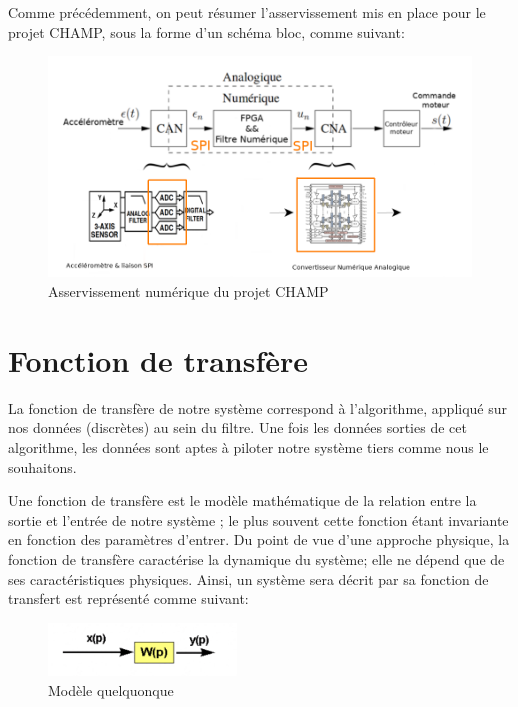 \documentclass[french,a4paper,12pt]{report}
\begin{document}
		Comme précédemment, on peut résumer l'asservissement mis en place pour le projet CHAMP, sous la forme d'un schéma bloc, comme suivant:
		
	\begin{figure}[!ht]
    \center
  	\includegraphics[width=17cm]{Assert_2.png}
    \caption{Asservissement numérique du projet CHAMP}
	\end{figure}	
		
		
	\chapter{Fonction de transfère}
	
		La fonction de transfère de notre système correspond à l'algorithme, appliqué sur nos données (discrètes) au sein du filtre. Une fois les données sorties de cet algorithme, les données sont aptes à piloter notre système tiers comme nous le souhaitons.
		
		Une fonction de transfère est le modèle mathématique de la relation entre la sortie et l'entrée de notre système ; le plus souvent cette fonction étant invariante en fonction des paramètres d'entrer.
		Du point de vue d'une approche physique, la fonction de transfère caractérise la dynamique du système; elle ne dépend que de ses caractéristiques physiques. 
		Ainsi, un système sera décrit par sa fonction de transfert est représenté comme suivant:

	\begin{figure}[!ht]
    \center
  	\includegraphics[width=5cm]{transf1.png}
    \caption{Modèle quelquonque}
	\end{figure}
	
\end{document}
